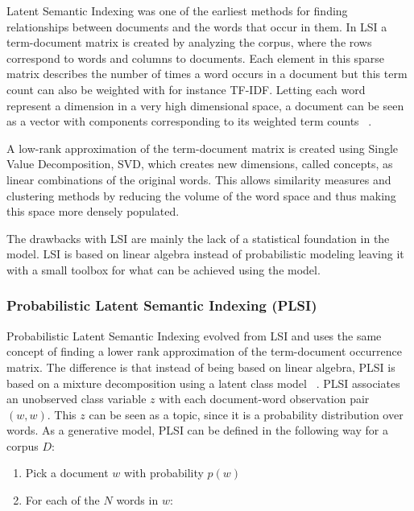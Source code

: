 \documentclass[12pt]{report}
\begin{document}
Latent Semantic Indexing was one of the earliest methods for finding
relationships between documents and the words that occur in them. In LSI a
term-document matrix is created by analyzing the corpus, where the rows
correspond to words and columns to documents. Each element in this sparse
matrix describes the number of times a word occurs in a document but this term
count can also be weighted with for instance TF-IDF. Letting each word
represent a dimension in a very high dimensional space, a document can be seen
as a vector with components corresponding to its weighted term counts ~\cite{Deerwester90indexingby}.

A low-rank approximation of the term-document matrix is created using Single
Value Decomposition, SVD, which creates new dimensions, called concepts, as
linear combinations of the original words. This allows similarity measures and
clustering methods by reducing the volume of the word space and thus making
this space more densely populated.


The drawbacks with LSI are mainly the lack of a statistical foundation in the
model. LSI is based on linear algebra instead of probabilistic modeling leaving
it with a small toolbox for what can be achieved using the model.
	

\subsubsection{Probabilistic Latent Semantic Indexing (PLSI)}


Probabilistic Latent Semantic Indexing evolved from LSI and uses the same
concept of finding a lower rank approximation of the term-document occurrence
matrix. The difference is that instead of being based on linear algebra, PLSI
is based on a mixture decomposition using a latent class model 
~\cite{Hofmann:1999:PLS:312624.312649}. PLSI associates
an unobserved class variable $z$ with each document-word observation pair $(w,
w)$. This $z$ can be seen as a topic, since it is a probability distribution
over words. As a generative model, PLSI can be defined in the following way for
a corpus $D$:

\begin{enumerate}
\item Pick a document $w$ with probability $p(w)$
\item For each of the $N$ words in $w$:
\end{enumerate}
\end{document}
